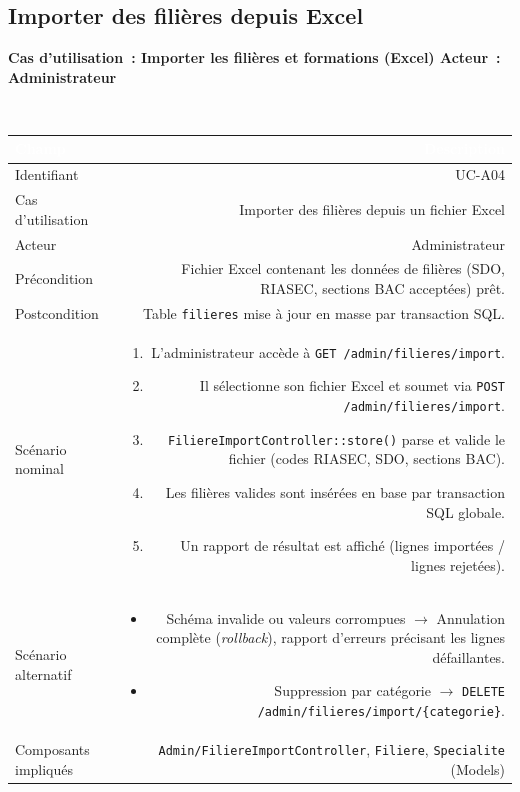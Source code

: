 \documentclass[a4paper,12pt]{article}
\newcommand{\ucheader}[2]{%
  \noindent\colorbox{capblue}{\parbox{\dimexpr\linewidth-2\fboxsep}{%
    \color{white}\bfseries\large Cas d'utilisation~: #1 \hfill \normalsize Acteur~: #2
  }}\\[2pt]
}
\begin{document}
\vspace{1em}

\subsection{Importer des filières depuis Excel}
\ucheader{Importer les filières et formations (Excel)}{Administrateur}

\noindent
\begin{tabular}{|L|R|}
\hline
{}\textcolor{white}{\textbf{Champ}} & \textcolor{white}{\textbf{Description}} \\
\hline
{}Identifiant & UC-A04 \\
\hline
Cas d'utilisation & Importer des filières depuis un fichier Excel \\
\hline
{}Acteur & Administrateur \\
\hline
Précondition & Fichier Excel contenant les données de filières (SDO, RIASEC, sections BAC acceptées) prêt. \\
\hline
{}Postcondition & Table \texttt{filieres} mise à jour en masse par transaction SQL. \\
\hline
Scénario nominal &
\begin{enumerate}
  \item L'administrateur accède à \texttt{GET /admin/filieres/import}.
  \item Il sélectionne son fichier Excel et soumet via \texttt{POST /admin/filieres/import}.
  \item \texttt{FiliereImportController::store()} parse et valide le fichier (codes RIASEC, SDO, sections BAC).
  \item Les filières valides sont insérées en base par transaction SQL globale.
  \item Un rapport de résultat est affiché (lignes importées / lignes rejetées).
\end{enumerate} \\
\hline
{}Scénario alternatif &
\begin{itemize}
  \item Schéma invalide ou valeurs corrompues $\rightarrow$ Annulation complète (\textit{rollback}), rapport d'erreurs précisant les lignes défaillantes.
  \item Suppression par catégorie $\rightarrow$ \texttt{DELETE /admin/filieres/import/\{categorie\}}.
\end{itemize} \\
\hline
Composants impliqués & \texttt{Admin/FiliereImportController}, \texttt{Filiere}, \texttt{Specialite} (Models) \\
\hline
\end{tabular}
\end{document}
